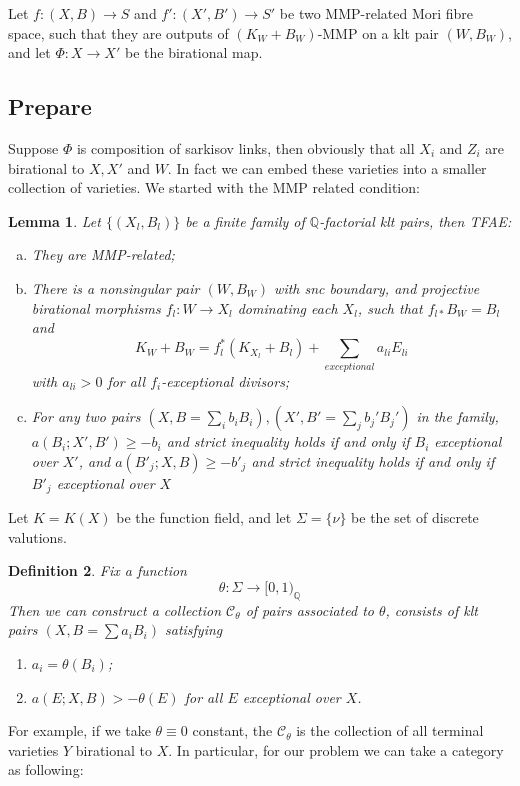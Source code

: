 \documentclass{article}
\newtheorem{defn}{Definition}[subsection]
\newtheorem{lem}[defn]{Lemma}
\begin{document}
Let $f:(X,B)\to S$ and $f':(X',B')\to S'$ be two MMP-related Mori fibre space, such that they are outputs of $(K_{W}+B_{W})$-MMP on a klt pair $(W,B_W)$,  and let $\Phi:X\to X'$ be the birational map.

\subsection{Prepare}
Suppose $\Phi$ is composition of sarkisov links, then obviously that all $X_i$ and $Z_i$ are birational to $X,X'$ and $W$. In fact we can embed these varieties into a smaller collection of varieties. We started with the MMP related condition:
\begin{lem}
  Let $ \{(X_l,B_l)\} $ be a finite family of $ \mathbb{Q} $-factorial klt pairs, then TFAE:
  \begin{enumerate}[(a)]
    \item They are MMP-related;
    \item There is a nonsingular pair $ (W,B_W) $ with snc boundary, and projective birational morphisms $ f_l:W\to  X_l $ dominating each $ X_l $, such that $ f_{l*}B_W=B_l $ and
      \[ K_W+B_W=f_l^*(K_{X_l}+B_l)+\sum_{exceptional}{a_{li}E_{li}} \]
      with $ a_{li}>0 $ for all $ f_i $-exceptional divisors;
    \item For any two pairs $ (X,B=\sum_ib_iB_i),(X',B'=\sum _jb_j'B_j') $ in the family,  $ a(B_i;X',B')\geqslant -b_i $ and strict inequality holds if and only if $ B_i $ exceptional over $ X' $, and $ a(B'_j;X,B)\geqslant -b'_j $ and strict inequality holds if and only if $ B'_j $ exceptional over $ X $
  \end{enumerate}
\end{lem}
Let $ K=K(X) $ be the function field, and let $ \Sigma=\{\nu\} $ be the set of discrete valutions. 
\begin{defn}
  Fix a function 
  \[ \theta:\Sigma\to [0,1)_\mathbb{Q} \]
  Then we can construct a collection $ \mathcal{C}_\theta $ of pairs  associated to $ \theta $, consists of klt pairs $ (X,B=\sum a_iB_i) $ satisfying
  \begin{enumerate}
    \item $ a_i=\theta(B_i) $;
    \item $ a(E;X,B)>-\theta(E) $ for all $ E $ exceptional over $ X $.
  \end{enumerate} 
\end{defn}
For example, if we take $\theta \equiv 0$ constant, the $\mathcal{C}_{\theta}$ is the collection of all terminal varieties $Y$ birational to $X$. In particular, for our problem we can take a category as following:
\end{document}
